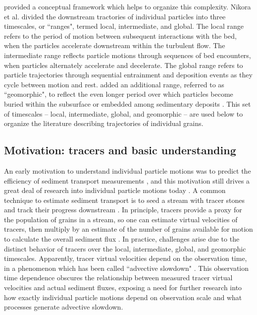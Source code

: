 \citet{Nikora2001,Nikora2002} provided a conceptual framework which helps to organize this complexity.
Nikora et al. divided the downstream tractories of individual particles into three timescales, or ``ranges", termed local, intermediate, and global.
The local range refers to the period of motion between subsequent interactions with the bed, when the particles accelerate downstream within the turbulent flow.
The intermediate range reflects particle motions through sequences of bed encounters, when particles alternately accelerate and decelerate. 
The global range refers to particle trajectories through sequential entrainment and deposition events as they cycle between motion and rest.
\citet{Hassan2017} added an additional range, referred to as ``geomorphic", to reflect the even longer period over which particles become buried within the subsurface or embedded among sedimentary deposits \citep{Bradley2017}.
This set of timescales -- local, intermediate, global, and geomorphic -- are used below to organize the literature describing trajectories of individual grains.

\subsection{Motivation: tracers and basic understanding}

An early motivation to understand individual particle motions was to predict the efficiency of sediment transport measurements \citep{Ettema2004}, and this motivation still drives a great deal of research into individual particle motions today \citep{Hassan2017,Pretzlav2021}.
A common technique to estimate sediment transport is to seed a stream with tracer stones and track their progress downstream \citep{Einstein1937, Takayama1965, Pretzlav2021}.
In principle, tracers provide a proxy for the population of grains in a stream, so one can estimate virtual velocities of tracers, then multiply by an estimate of the number of grains available for motion to calculate the overall sediment flux \citep{Wilcock1997a,Ferguson2002}.
In practice, challenges arise due to the distinct behavior of tracers over the local, intermediate, global, and geomorphic timescales. Apparently, tracer virtual velocities depend on the observation time, in a phenomenon which has been called ``advective slowdown" \citep{Ferguson2002,Haschenburger2011, Haschenburger2013, Pelosi2016}. This observation time dependence obscures the relationship between measured tracer virtual velocities and actual sediment fluxes, exposing a need for further research into how exactly individual particle motions depend on observation scale and what processes generate advective slowdown.

